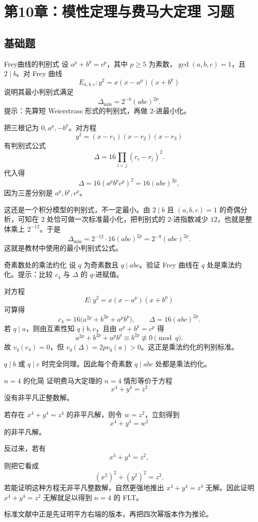 \chapter{第10章：模性定理与费马大定理 习题}
\difficultykey

\section{基础题 \easy}

\begin{problem}{Frey曲线的判别式}
设 $a^p+b^p=c^p$，其中 $p\ge5$ 为素数，$\gcd(a,b,c)=1$，且 $2\mid b$。对 Frey 曲线
\[
E_{a,b,c}:y^2=x(x-a^p)(x+b^p)
\]
说明其最小判别式满足
\[
\Delta_{\min}=2^{-8}(abc)^{2p}.
\]
提示：先算短 Weierstrass 形式的判别式，再做 $2$-进最小化。
\end{problem}
\begin{solution}
把三根记为 $0,a^p,-b^p$。对方程
\[
y^2=(x-r_1)(x-r_2)(x-r_3)
\]
有判别式公式
\[
\Delta=16\prod_{i<j}(r_i-r_j)^2.
\]
代入得
\[
\Delta=16(a^pb^pc^p)^2=16(abc)^{2p},
\]
因为三差分别是 $a^p,b^p,c^p$。

这还是一个积分模型的判别式，不一定最小。由 $2\mid b$ 且 $(a,b,c)=1$ 的奇偶分析，可知在 $2$ 处恰可做一次标准最小化，把判别式的 $2$-进指数减少 $12$，也就是整体乘上 $2^{-12}$。于是
\[
\Delta_{\min}=2^{-12}\cdot16(abc)^{2p}=2^{-8}(abc)^{2p}.
\]
这就是教材中使用的最小判别式公式。
\end{solution}

\begin{problem}{奇素数处的乘法约化}
设 $q$ 为奇素数且 $q\mid abc$。验证 Frey 曲线在 $q$ 处是乘法约化。提示：比较 $c_4$ 与 $\Delta$ 的 $q$-进赋值。
\end{problem}
\begin{solution}
对方程
\[
E:y^2=x(x-a^p)(x+b^p)
\]
可算得
\[
c_4=16\bigl(a^{2p}+b^{2p}+a^pb^p\bigr),
\qquad
\Delta=16(abc)^{2p}.
\]
若 $q\mid a$，则由互素性知 $q\nmid b,c$，且由 $a^p+b^p=c^p$ 得
\[
a^{2p}+b^{2p}+a^pb^p\equiv b^{2p}\not\equiv0\pmod q.
\]
故 $v_q(c_4)=0$，但 $v_q(\Delta)=2pv_q(a)>0$。这正是乘法约化的判别标准。

$q\mid b$ 或 $q\mid c$ 时完全同理。因此每个奇素数 $q\mid abc$ 处都是乘法约化。
\end{solution}

\begin{problem}{$n=4$ 的化简}
证明费马大定理的 $n=4$ 情形等价于方程
\[
x^4+y^4=z^2
\]
没有非平凡正整数解。
\end{problem}
\begin{solution}
若存在 $x^4+y^4=z^4$ 的非平凡解，则令 $w=z^2$，立刻得到
\[
x^4+y^4=w^2
\]
的非平凡解。

反过来，若有
\[
x^4+y^4=z^2,
\]
则把它看成
\[
(x^2)^2+(y^2)^2=z^2.
\]
若能证明这种方程无非平凡整数解，自然更强地推出 $x^4+y^4=z^4$ 无解。因此证明 $x^4+y^4=z^2$ 无解就足以得到 $n=4$ 的 FLT。

标准文献中正是先证明平方右端的版本，再把四次幂版本作为推论。
\end{solution}

